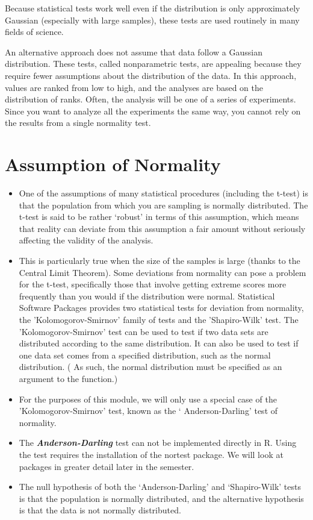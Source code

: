 \documentclass[a4paper,12pt]{article}
\begin{document}
Because statistical tests work well even if the distribution is only approximately Gaussian (especially with large samples), these tests are used routinely in many fields of science.

An alternative approach does not assume that data follow a Gaussian distribution. These tests, called nonparametric tests, are appealing because they require fewer assumptions about the distribution of the data. In this approach, values are ranked from low to high, and the analyses are based on the distribution of ranks.
Often, the analysis will be one of a series of experiments. Since you want to analyze all the experiments the same way, you cannot rely on the results from a single normality test.

\section*{Assumption of Normality}
 \begin{itemize}
\item One of the assumptions of many statistical procedures (including the t-test) is that the population from which you are sampling is normally distributed. The t-test is said to be rather ‘robust’ in terms of this 
assumption, which means that reality can deviate from this assumption a fair amount without seriously affecting the validity of the analysis. 
\item  
This is particularly true when the size of the samples is large (thanks to the Central Limit Theorem). Some deviations from normality can pose a problem for the t-test, specifically those that involve getting extreme 
scores more frequently than you would if the distribution were normal. Statistical Software Packages provides two statistical tests for deviation 
from normality, the 'Kolomogorov-Smirnov' family of tests and the 'Shapiro-Wilk' test. The 'Kolomogorov-Smirnov' test can be used to test if two data sets are distributed according to the same distribution. It can also be used to test if one data set comes from a specified distribution, such as the normal distribution. ( As such, the normal distribution must be specified as an  argument to the function.) 
\item 
For the purposes of this module, we will only use a special case of the 'Kolomogorov-Smirnov' test, known as the ‘ Anderson-Darling' test of 
normality. 
\item 
The \textit{\textbf{Anderson-Darling}} test can not be implemented directly in R. Using the test requires the installation of the nortest package. We will look at 
packages in greater detail later in the semester. 
\item  
The null hypothesis of both the `Anderson-Darling’ and `Shapiro-Wilk’ tests is that the population is normally distributed, and the alternative 
hypothesis is that the data is not normally distributed. 
\end{itemize} 
\end{document}
